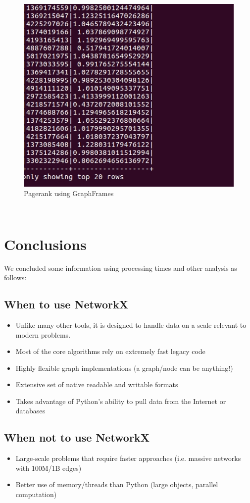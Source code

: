 \begin{figure}[!ht]
	\centering
	\includegraphics[scale=0.5]{input/images/pggf.jpg}              
	\caption{Pagerank using GraphFrames}
\end{figure}\\
 
\section{Conclusions}
We concluded some information using processing times and other analysis as follows:  
\subsection{When to use NetworkX}
\begin{itemize}
	\item Unlike many other tools, it is designed to handle data on a scale relevant to
	modern problems.
	\item Most of the core algorithms rely on extremely fast legacy code
	\item Highly flexible graph implementations (a graph/node can be anything!)
	\item Extensive set of native readable and writable formats
	\item Takes advantage of Python’s ability to pull data from the Internet or databases
\end{itemize}
\subsection{When not to use NetworkX}
\begin{itemize}
	\item Large-scale problems that require faster approaches (i.e. massive networks
	with 100M/1B edges)
	\item Better use of memory/threads than Python (large objects, parallel computation)
\end{itemize}


